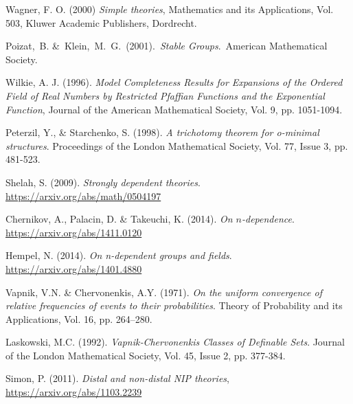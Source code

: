 \documentclass[a4paper]{report}
\theoremstyle{definition}
\theoremstyle{remstyle}
\begin{document}
\begin{thebibliography}{100}
	 Wagner, F. O. (2000) \emph{Simple theories}, Mathematics and its Applications, Vol.
	503, Kluwer Academic Publishers, Dordrecht.

	 Poizat, B. \& Klein, M. G. (2001). \emph{Stable Groups}. American Mathematical Society.

	 Wilkie, A. J. (1996). \emph{Model Completeness Results for Expansions of the Ordered Field of Real Numbers by Restricted Pfaffian Functions and the Exponential Function}, Journal of the American Mathematical Society, Vol. 9, pp. 1051-1094.

	 Peterzil, Y., \& Starchenko, S. (1998). \emph{A trichotomy theorem for o-minimal structures}. Proceedings of the London Mathematical Society, Vol. 77, Issue 3, pp. 481-523.

	 Shelah, S. (2009). \emph{Strongly dependent theories}. \url{https://arxiv.org/abs/math/0504197}

	 Chernikov, A., Palacin, D. \& Takeuchi, K. (2014).  \emph{On $n$-dependence}. \url{https://arxiv.org/abs/1411.0120}

	 Hempel, N. (2014). \emph{On n-dependent groups and fields}.
	\url{https://arxiv.org/abs/1401.4880}

	 Vapnik, V.N. \& Chervonenkis, A.Y. (1971). \emph{On the uniform convergence of relative frequencies of events to their probabilities}. Theory of Probability and its Applications, Vol. 16, pp. 264–280.

	 Laskowski, M.C. (1992). \emph{Vapnik‐Chervonenkis Classes of Definable Sets}. Journal of the London Mathematical Society, Vol. 45, Issue 2, pp. 377-384.

	 Simon, P. (2011). \emph{Distal and non-distal NIP theories}, \url{https://arxiv.org/abs/1103.2239}

\end{thebibliography}
\end{document}

